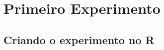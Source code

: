\chapter{Primeiro Experimento}
\label{chap:primeiro_experimento}


\section{Criando o experimento no R}
\label{sec:primeiro_experimento_criando o experimento_no_R}



\begin{table}[H]
  \centering
  \caption{Experimento de modelagem do helicóptero de papel.}
\end{table}
